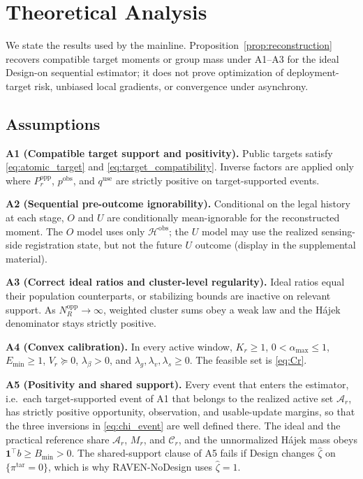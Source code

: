 \documentclass[letterpaper,journal]{IEEEtran}
\begin{document}
\section{Theoretical Analysis}
\label{sec:theory}

We state the results used by the mainline.  Proposition~\ref{prop:reconstruction}
recovers compatible target moments or group mass under A1--A3 for the
ideal Design-on sequential estimator; it does not
prove optimization of deployment-target risk, unbiased local gradients, or
convergence under asynchrony.

\subsection{Assumptions}
\label{subsec:assumptions}

\noindent\textbf{A1 (Compatible target support and positivity).}
Public targets satisfy \eqref{eq:atomic_target} and
\eqref{eq:target_compatibility}.  Inverse factors are applied only where
$P_r^{\mathrm{opp}}$, $p^{\mathrm{obs}}$, and $q^{\mathrm{use}}$ are
strictly positive on target-supported events.

\noindent\textbf{A2 (Sequential pre-outcome ignorability).}
Conditional on the legal history at each stage, $O$ and $U$ are
conditionally mean-ignorable for the reconstructed moment.  The $O$ model
uses only $\mathcal{H}^{\mathrm{obs}}$; the $U$ model may use the realized
sensing-side registration state, but not the future $U$ outcome
(display in the supplemental material).

\noindent\textbf{A3 (Correct ideal ratios and cluster-level regularity).}
Ideal ratios equal their population counterparts, or stabilizing bounds are
inactive on relevant support.  As $N_R^{\mathrm{opp}}\rightarrow\infty$,
weighted cluster sums obey a weak law and the H\'ajek denominator stays
strictly positive.

\noindent\textbf{A4 (Convex calibration).}
In every active window, $K_r\ge1$, $0<\alpha_{\max}\le1$, $E_{\min}\ge1$,
$V_r\succeq0$, $\lambda_{\beta}>0$, and
$\lambda_g,\lambda_v,\lambda_s\ge0$.  The feasible set is \eqref{eq:Cr}.

\noindent\textbf{A5 (Positivity and shared support).}
Every event that enters the estimator, i.e.\ each target-supported event of
A1 that belongs to the realized active set $\mathcal{A}_r$, has strictly
positive opportunity, observation, and usable-update margins, so that the
three inversions in \eqref{eq:chi_event} are well defined there.  The ideal and
the practical reference share $\mathcal{A}_r$, $M_r$, and $\mathcal{C}_r$,
and the unnormalized H\'ajek mass obeys
$\mathbf{1}^{\top}b\ge B_{\min}>0$.  The shared-support clause of A5 fails
if Design changes $\widehat\zeta$ on $\{\pi^{\mathrm{tar}}=0\}$, which is why
RAVEN-NoDesign uses $\widehat\zeta=1$.
\end{document}
